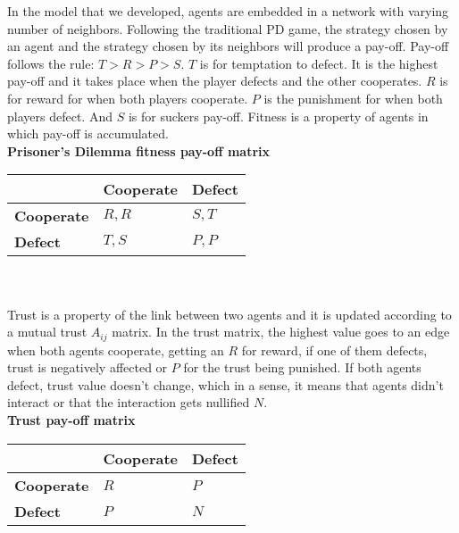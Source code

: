 In the model that we developed, agents are embedded in a network with
varying number of neighbors. Following the traditional PD game, the
strategy chosen by an agent and the strategy chosen by its neighbors
will produce a pay-off. Pay-off follows the rule: $T > R > P > S$. $T$
is for temptation to defect. It is the highest pay-off and it takes
place when the player defects and the other cooperates. $R$ is for
reward for when both players cooperate. $P$ is the punishment for when
both players defect. And $S$ is for suckers pay-off. Fitness is a
property of agents in which pay-off is accumulated.\\ 

{\bf Prisoner's Dilemma fitness pay-off matrix}\\

\begin{tabular}{| l | l | l |}
\hline
          & \bf{Cooperate} & \bf{Defect} \\ \hline
\bf{Cooperate} &  $R,R$      &  $S,T$   \\ \hline
\bf{Defect}    &  $T,S$      &  $P,P$   \\ \hline

\end{tabular}\\ \\

Trust is a property of the link between two agents and it is updated
according to a mutual trust $A_{ij}$ matrix. In the trust matrix, the
highest value goes to an edge when both agents cooperate, getting an
$R$ for reward, if one of them defects, trust is negatively affected
or $P$ for the trust being punished. If both agents defect, trust
value doesn't change, which in a sense, it means that agents didn't
interact or that the interaction gets nullified $N$. \\

{\bf Trust pay-off matrix}\\

\begin{tabular}{| l | l | l |}
\hline
          & \bf{Cooperate} & \bf{Defect} \\ \hline
\bf{Cooperate} &  $R$      &  $P$   \\ \hline
\bf{Defect}    &  $P$      &  $N$   \\ \hline

\end{tabular}\\ \\


